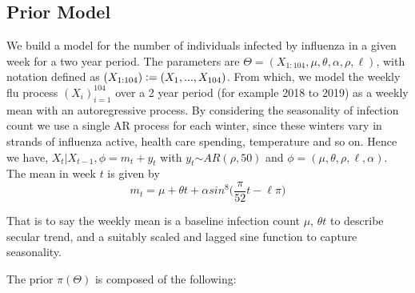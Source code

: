 \documentclass{article}
\begin{document}
\subsection{Prior Model}
We build a model for the number of individuals infected by influenza in a given week for a two year period. The parameters are $ \Theta = (X_{1:104},\mu, \theta, \alpha, \rho, \ell)$, with notation defined as $(X_{1:104}) \vcentcolon= (X_{1},...,X_{104})$. From which, we model the weekly flu process $(X_{i})_{i=1}^{104}$ over a 2 year period (for example 2018 to 2019) as a weekly mean with an autoregressive process. By considering the seasonality of infection count we use a single AR process for each winter, since these winters vary in strands of influenza active, health care spending, temperature and so on. Hence we have, $X_{t}|X_{t-1},\phi = m_{t}+y_{t}$ with $y_{t} \stackrel{}{\sim} AR(\rho,50)$ and $\phi = (\mu, \theta, \rho, \ell, \alpha)$. The mean in week $t$ is given by 
$$
m_{t} = \mu + \theta t + \alpha sin^8\Big(\frac{\pi}{52}t - \ell\pi\Big)
$$


That is to say the weekly mean is a baseline infection count $\mu$, $\theta t$ to describe secular trend, and a suitably scaled and lagged sine function to capture seasonality. 

The prior $\pi(\Theta)$ is composed of the following: 
\end{document}

